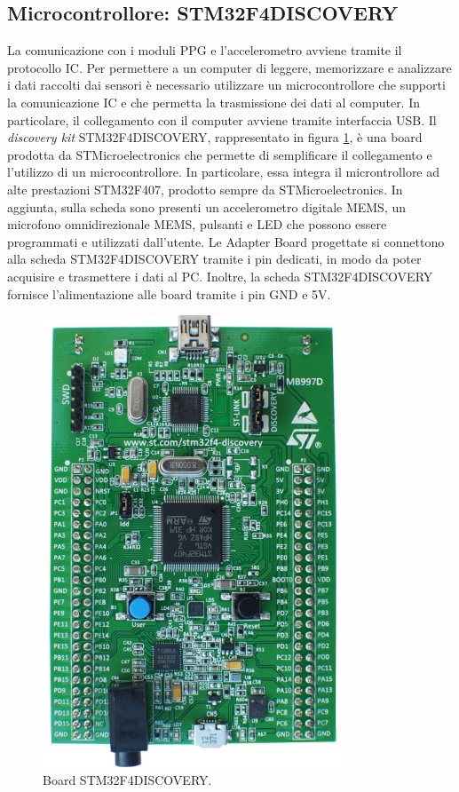 \subsection{Microcontrollore: STM32F4DISCOVERY}
La comunicazione con i moduli PPG e l'accelerometro avviene tramite il protocollo IC. Per permettere a un computer di leggere, memorizzare e analizzare i dati raccolti dai sensori è necessario utilizzare un microcontrollore che supporti la comunicazione IC e che permetta la trasmissione dei dati al computer. In particolare, il collegamento con il computer avviene tramite interfaccia USB. Il \textit{discovery kit} STM32F4DISCOVERY\cite{STMicroelectronics2020}, rappresentato in figura \ref{fig:ImmagineSTM32F4DISCOVERY}, è una board prodotta da STMicroelectronics che permette di semplificare il collegamento e l'utilizzo di un microcontrollore. In particolare, essa integra il microntrollore ad alte prestazioni STM32F407, prodotto sempre da STMicroelectronics. In aggiunta, sulla scheda sono presenti un accelerometro digitale MEMS, un microfono omnidirezionale MEMS, pulsanti e LED che possono essere programmati e utilizzati dall'utente. Le Adapter Board progettate si connettono alla scheda STM32F4DISCOVERY tramite i pin dedicati, in modo da poter acquisire e trasmettere i dati al PC. Inoltre, la scheda STM32F4DISCOVERY fornisce l'alimentazione alle board tramite i pin GND e 5V.
\begin{figure}[h]
	\centering
	\includegraphics[width=0.5\linewidth]{ImageFiles/Hardware/ImmagineSTM32F4DISCOVERY}
	\caption{Board STM32F4DISCOVERY.}
	\label{fig:ImmagineSTM32F4DISCOVERY}
\end{figure}

\clearpage